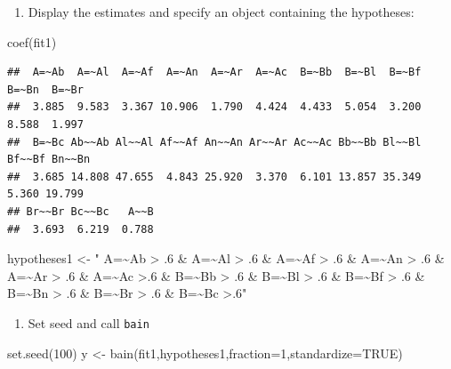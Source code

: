 \documentclass[
]{book}
\newenvironment{Shaded}{\begin{snugshade}}{\end{snugshade}}
\newcommand{\AttributeTok}[1]{\textcolor[rgb]{0.77,0.63,0.00}{#1}}
\newcommand{\ConstantTok}[1]{\textcolor[rgb]{0.00,0.00,0.00}{#1}}
\newcommand{\DecValTok}[1]{\textcolor[rgb]{0.00,0.00,0.81}{#1}}
\newcommand{\FunctionTok}[1]{\textcolor[rgb]{0.00,0.00,0.00}{#1}}
\newcommand{\NormalTok}[1]{#1}
\newcommand{\OtherTok}[1]{\textcolor[rgb]{0.56,0.35,0.01}{#1}}
\newcommand{\StringTok}[1]{\textcolor[rgb]{0.31,0.60,0.02}{#1}}
\providecommand{\tightlist}{%
  \setlength{\itemsep}{0pt}\setlength{\parskip}{0pt}}
\begin{document}
\begin{enumerate}
\def\labelenumi{\arabic{enumi})}
\setcounter{enumi}{1}
\tightlist
\item
  Display the estimates and specify an object containing the hypotheses:
\end{enumerate}

\begin{Shaded}
\begin{Highlighting}[]
\FunctionTok{coef}\NormalTok{(fit1)}
\end{Highlighting}
\end{Shaded}

\begin{verbatim}
##  A=~Ab  A=~Al  A=~Af  A=~An  A=~Ar  A=~Ac  B=~Bb  B=~Bl  B=~Bf  B=~Bn  B=~Br 
##  3.885  9.583  3.367 10.906  1.790  4.424  4.433  5.054  3.200  8.588  1.997 
##  B=~Bc Ab~~Ab Al~~Al Af~~Af An~~An Ar~~Ar Ac~~Ac Bb~~Bb Bl~~Bl Bf~~Bf Bn~~Bn 
##  3.685 14.808 47.655  4.843 25.920  3.370  6.101 13.857 35.349  5.360 19.799 
## Br~~Br Bc~~Bc   A~~B 
##  3.693  6.219  0.788
\end{verbatim}

\begin{Shaded}
\begin{Highlighting}[]
\NormalTok{hypotheses1 }\OtherTok{\textless{}{-}}
\StringTok{" A=\textasciitilde{}Ab \textgreater{} .6 \& A=\textasciitilde{}Al \textgreater{} .6 \& A=\textasciitilde{}Af \textgreater{} .6 \& A=\textasciitilde{}An \textgreater{} .6 \& A=\textasciitilde{}Ar \textgreater{} .6 \& A=\textasciitilde{}Ac \textgreater{}.6 \& }
\StringTok{B=\textasciitilde{}Bb \textgreater{} .6 \& B=\textasciitilde{}Bl \textgreater{} .6 \& B=\textasciitilde{}Bf \textgreater{} .6 \& B=\textasciitilde{}Bn \textgreater{} .6 \& B=\textasciitilde{}Br \textgreater{} .6 \& B=\textasciitilde{}Bc \textgreater{}.6"}
\end{Highlighting}
\end{Shaded}

\begin{enumerate}
\def\labelenumi{\arabic{enumi})}
\setcounter{enumi}{2}
\tightlist
\item
  Set seed and call \texttt{bain}
\end{enumerate}

\begin{Shaded}
\begin{Highlighting}[]
\FunctionTok{set.seed}\NormalTok{(}\DecValTok{100}\NormalTok{)}
\NormalTok{y }\OtherTok{\textless{}{-}} \FunctionTok{bain}\NormalTok{(fit1,hypotheses1,}\AttributeTok{fraction=}\DecValTok{1}\NormalTok{,}\AttributeTok{standardize=}\ConstantTok{TRUE}\NormalTok{)}
\end{Highlighting}
\end{Shaded}
\end{document}
